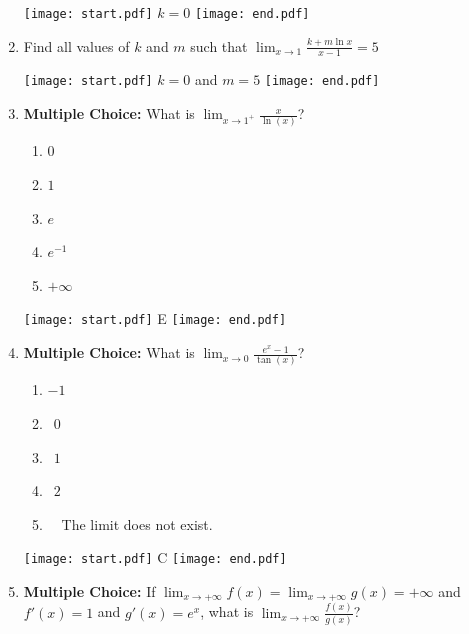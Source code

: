 \documentclass[12pt]{article}
\begin{document}
\begin{enumerate}
\texttt{[image: start.pdf]}
{{$k=0$}}
\texttt{[image: end.pdf]}


\item Find all values of $k$ and $m$ such that $\lim_{x \rightarrow 1}{\frac{k+m\ln{x}}{x-1}}=5$

\texttt{[image: start.pdf]}
{{$k=0$ and $m=5$}}
\texttt{[image: end.pdf]}


\item {\bf Multiple Choice:} What is $\displaystyle \lim_{x\rightarrow 1^+} \frac{x}{\ln(x)}$?

\begin{enumerate}

\item $0$\\

\item $1$\\

\item $e$\\

\item $e^{-1}$\\

\item $+\infty$

\end{enumerate}

\texttt{[image: start.pdf]}
{{E}}
\texttt{[image: end.pdf]}


\item {\bf Multiple Choice:} What is $\displaystyle \lim_{x\rightarrow 0}\frac{e^x-1}{\tan(x)}$?

\begin{enumerate}

\item $-1$

\item $\ \ 0$

\item $\ \ 1$

\item $\ \ 2$

\item \ \ The limit does not exist.

\end{enumerate}

\texttt{[image: start.pdf]}
{{C}}
\texttt{[image: end.pdf]}


\item {\bf Multiple Choice:} If $\displaystyle \lim_{x\rightarrow +\infty} f(x) =
\lim_{x\rightarrow +\infty} g(x) = +\infty$ and $f'(x)=1$ and $g'(x)=e^x$, what is 
$\displaystyle \lim_{x\rightarrow +\infty}\frac{f(x)}{g(x)}$?


\end{enumerate}
\end{document}
